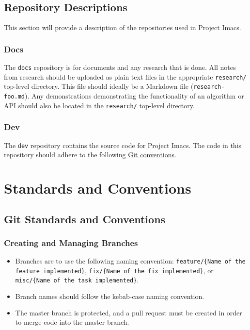 \documentclass{article}
\begin{document}
\subsection{Repository Descriptions}
This section will provide a description of the repositories used in Project Imacs.

\subsubsection{Docs}
The \texttt{docs} repository is for documents and any research that is done. All notes from research should be uploaded as plain text files in the appropriate \texttt{research/} top-level directory. This file should ideally be a Markdown file (\texttt{research-foo.md}). Any demonstrations demonstrating the functionality of an algorithm or API should also be located in the \texttt{research/} top-level directory.

\subsubsection{Dev}
The \texttt{dev} repository contains the source code for Project Imacs. The code in this repository should adhere to the following \hyperref[sec:git-conventions]{Git conventions}.

\section{Standards and Conventions}
\subsection{Git Standards and Conventions}
\label{sec:git-conventions}
\subsubsection{Creating and Managing Branches}
\begin{itemize}
\item Branches are to use the following naming convention: \texttt{feature/\{Name of the feature implemented\}}, \texttt{fix/\{Name of the fix implemented\}}, or \texttt{misc/\{Name of the task implemented\}}.
\item Branch names should follow the kebab-case naming convention.
\item The master branch is protected, and a pull request must be created in order to merge code into the master branch.
\end{itemize}
\end{document}
